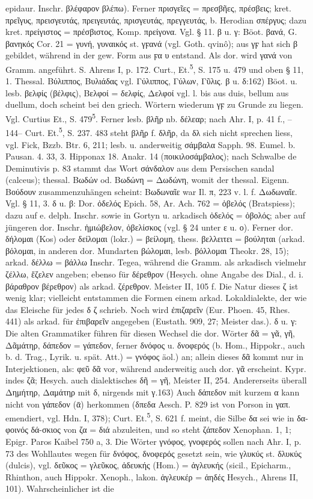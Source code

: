 epidaur. Inschr. βλέφαρον βλέπω). Ferner πρισγεῖες  = πρεσβῆες, πρέσβεις; kret. πρεῖγυς, πρεισγευτάς, πρειγευτάς, πρισγευτάς, πρεγγευτάς, b. Herodian σπέργυς; dazu kret. πρείγιστος = πρέσβιστος, Komp. πρείγονα. Vgl. § 11. β u. γ: Böot. βανά, G. βανηκός Cor. 21 = γυνή, γυναικός st. γϝανά (vgl. Goth. qvinô); aus γϝ hat sich β gebildet, während in der gew. Form aus ϝα υ entstand. Als dor. wird γανά von Gramm. angeführt. S. Ahrens I, p. 172. Curt., Et.\textsuperscript{5}, S. 175 u. 479 und oben § 11, 1. Thessal. Βύλιππος, Βυλιάδας vgl. Γύλιππος, Γύλων, Γῦλις. β u. δ:162) Böot. u. lesb. βελφίς (βέλφις), Βελφοί = δελφίς, Δελφοί vgl. l. bis aus duis, bellum aus duellum, doch scheint bei den griech. Wörtern wiederum γϝ zu Grunde zu liegen. Vgl. Curtius Et., S. 479\textsuperscript{5}. Ferner lesb. βλῆρ nb. δέλεαρ; nach Ahr. I, p. 41 f., --144-- Curt. Et.\textsuperscript{5}, S. 237. 483 steht βλῆρ f. δλῆρ, da δλ sich nicht sprechen liess, vgl. Fick, Bzzb. Btr. 6, 211; lesb. u. anderweitig σάμβαλα Sapph. 98. Eumel. b. Pausan. 4. 33, 3. Hipponax 18. Anakr. 14 (ποικιλοσάμβαλος); nach Schwalbe de Deminutivis p. 83 stammt das Wort σάνδαλον aus dem Persischen sandal (calceus); thessal. Βωδών od. Βωδώνη = Δωδώνη, womit der thessal. Eigenn. Βούδουν zusammenzuhängen scheint: Βωδωναῖε war Il. π, 223 v. l. f. Δωδωναῖε. Vgl. § 11, 3. δ u. β: Dor. ὀδελός Epich. 58, Ar. Ach. 762 = ὀβελός (Bratspiess); dazu auf e. delph. Inschr. sowie in Gortyn u. arkadisch ὀδελός = ὀβολός; aber auf jüngeren dor. Inschr. ἡμιώβελον, ὀβελίσκος (vgl. § 24 unter ε u. ο). Ferner dor. δήλομαι (Kos) oder δείλομαι (lokr.) =  βείλομη, thess. βελλειτει = βούληται (arkad. βόλομαι, in anderen dor. Mundarten βώλομαι, lesb. βόλλομαι Theokr. 28, 15); arkad. δέλλω = βάλλω Inschr. Tegea, während die Gramm. als arkadisch vielmehr ζέλλω, ἔζελεν angeben; ebenso für δέρεθρον (Hesych. ohne Angabe des Dial., d. i. βάραθρον βέρεθρον) als arkad. ζέρεθρον. Meister II, 105 f. Die Natur dieses ζ ist wenig klar; vielleicht entstammen die Formen einem arkad. Lokaldialekte, der wie das Eleische für jedes δ ζ schrieb. Noch wird ἐπιζαρεῖν (Eur. Phoen. 45, Rhes. 441) als arkad. für ἐπιβαρεῖν angegeben (Eustath. 909, 27; Meister das.). δ u. γ: Die alten Grammatiker führen für diesen Wechsel die dor. Wörter δᾶ = γᾶ, γῆ, Δᾶμάτηρ, δάπεδον = γάπεδον, ferner δνόφος u. δνοφερός (b. Hom., Hippokr., auch b. d. Trag., Lyrik. u. spät. Att.) = γνόφος äol.) an; allein dieses δᾶ kommt nur in Interjektionen, als: φεῦ δᾶ vor, während anderweitig auch dor. γᾶ erscheint. Kypr. indes ζᾶ; Hesych. auch dialektisches δῆ = γῆ, Meister II, 254. Andererseits überall Δημήτηρ, Δαμάτηρ mit δ, nirgends mit γ.163) Auch δάπεδον mit kurzem α kann nicht von γάπεδον (ᾱ) herkommen (δπεδα Aesch. P. 829 ist von Porson in γαπ. emendiert, vgl. Hdn. I, 378); Curt. Et.\textsuperscript{5}, S. 621 f. meint, die Silbe δα sei wie in δα-φοινός δά-σκιος von ζα = διά abzuleiten, und so steht ζάπεδον Xenophan. 1, 1; Epigr. Paros Kaibel 750 a, 3. Die Wörter γνόφος, γνοφερός sollen nach Ahr. I, p. 73 des Wohllautes wegen für δνόφος, δνοφερός gesetzt sein, wie γλυκύς st. δλυκύς (dulcis), vgl. δεῦκος = γλεῦκος, ἀδευκής (Hom.) = ἀγλευκής (sicil., Epicharm., Rhinthon, auch Hippokr. Xenoph., lakon. ἀγλευκέρ = ἀηδές Hesych., Ahrens II, 101). Wahrscheinlicher ist die 